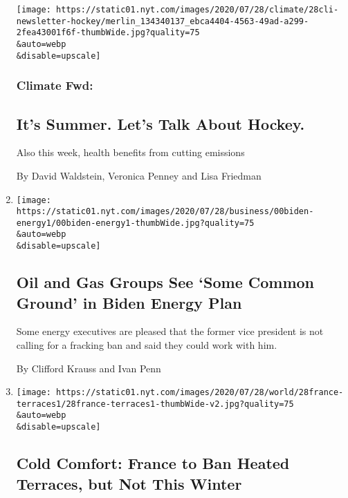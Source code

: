 \begin{enumerate}
  \texttt{[image: https://static01.nyt.com/images/2020/07/28/climate/28cli-newsletter-hockey/merlin\_134340137\_ebca4404-4563-49ad-a299-2fea43001f6f-thumbWide.jpg?quality=75\\\&auto=webp\\\&disable=upscale]}

  \hypertarget{climate-fwd}{%
  \subsubsection{Climate Fwd:}\label{climate-fwd}}

  \hypertarget{its-summer-lets-talk-about-hockey}{%
  \subsection{It's Summer. Let's Talk About
  Hockey.}\label{its-summer-lets-talk-about-hockey}}

  Also this week, health benefits from cutting emissions

  By David Waldstein, Veronica Penney and Lisa Friedman
\item
  \href{/2020/07/28/business/energy-environment/joe-biden-oil-gas-energy.html}{}

  \texttt{[image: https://static01.nyt.com/images/2020/07/28/business/00biden-energy1/00biden-energy1-thumbWide.jpg?quality=75\\\&auto=webp\\\&disable=upscale]}

  \hypertarget{oil-and-gas-groups-see-some-common-ground-in-biden-energy-plan}{%
  \subsection{Oil and Gas Groups See `Some Common Ground' in Biden
  Energy
  Plan}\label{oil-and-gas-groups-see-some-common-ground-in-biden-energy-plan}}

  Some energy executives are pleased that the former vice president is
  not calling for a fracking ban and said they could work with him.

  By Clifford Krauss and Ivan Penn
\item
  \href{/2020/07/28/world/europe/france-heated-terraces-coronavirus.html}{}

  \texttt{[image: https://static01.nyt.com/images/2020/07/28/world/28france-terraces1/28france-terraces1-thumbWide-v2.jpg?quality=75\\\&auto=webp\\\&disable=upscale]}

  \hypertarget{cold-comfort-france-to-ban-heated-terraces-but-not-this-winter}{%
  \subsection{Cold Comfort: France to Ban Heated Terraces, but Not This
  Winter}\label{cold-comfort-france-to-ban-heated-terraces-but-not-this-winter}}


\end{enumerate}
